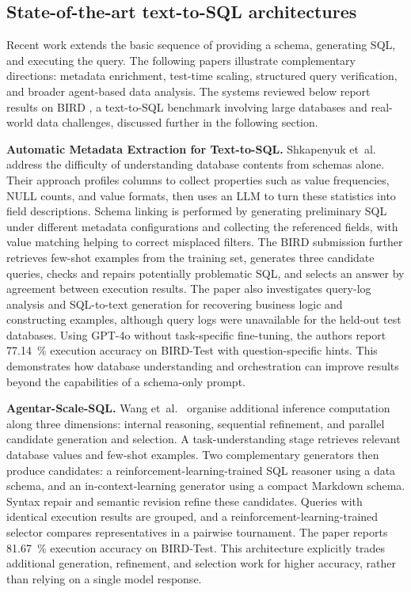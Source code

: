 \subsection{State-of-the-art text-to-SQL architectures} \label{sec:sota-text-to-sql}

Recent work extends the basic sequence of providing a schema, generating SQL, and executing the query. The
following papers illustrate complementary directions: metadata enrichment, test-time scaling, structured
query verification, and broader agent-based data analysis. The systems reviewed below report results on BIRD
\cite{li2023can}, a text-to-SQL benchmark involving large databases and real-world data challenges, discussed
further in the following section.

\textbf{Automatic Metadata Extraction for Text-to-SQL.} Shkapenyuk et~al.~\cite{shkapenyuk2025metadata}
address the difficulty of understanding database contents from schemas alone. Their approach profiles columns
to collect properties such as value frequencies, NULL counts, and value formats, then uses an LLM to turn
these statistics into field descriptions. Schema linking is performed by generating preliminary SQL under
different metadata configurations and collecting the referenced fields, with value matching helping to
correct misplaced filters. The BIRD submission further retrieves few-shot examples from the training set,
generates three candidate queries, checks and repairs potentially problematic SQL, and selects an answer by
agreement between execution results. The paper also investigates query-log analysis and SQL-to-text
generation for recovering business logic and constructing examples, although query logs were unavailable for
the held-out test databases. Using GPT-4o without task-specific fine-tuning, the authors report
\qty{77.14}{\percent} execution accuracy on BIRD-Test \cite{li2023can} with question-specific hints. This
demonstrates how database understanding and orchestration can improve results beyond the capabilities of a
schema-only prompt.

\textbf{Agentar-Scale-SQL.} Wang et~al.~\cite{wang2025agentar} organise additional inference computation
along three dimensions: internal reasoning, sequential refinement, and parallel candidate generation and
selection. A task-understanding stage retrieves relevant database values and few-shot examples. Two
complementary generators then produce candidates: a reinforcement-learning-trained SQL reasoner using a data
schema, and an in-context-learning generator using a compact Markdown schema. Syntax repair and semantic
revision refine these candidates. Queries with identical execution results are grouped, and a
reinforcement-learning-trained selector compares representatives in a pairwise tournament. The paper reports
\qty{81.67}{\percent} execution accuracy on BIRD-Test. This architecture explicitly trades additional
generation, refinement, and selection work for higher accuracy, rather than relying on a single model response.

